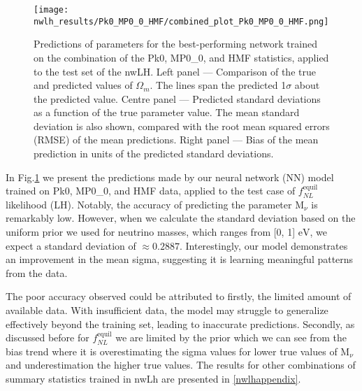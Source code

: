 \begin{figure}[htbp]
    \centering
    \texttt{[image: nwlh\_results/Pk0\_MP0\_0\_HMF/combined\_plot\_Pk0\_MP0\_0\_HMF.png]}
    \caption{Predictions of parameters for the best-performing network trained on the combination of the Pk0, MP0\_0, and HMF statistics, applied to the test set of the nwLH. Left panel — Comparison of the true and predicted values of $\Omega_m$. The lines span the predicted 1$\sigma$ about the predicted value. Centre panel — Predicted standard deviations as a function of the true parameter value. The mean standard deviation is also shown, compared with the root mean squared errors (RMSE) of the mean predictions. Right panel — Bias of the mean prediction in units of the predicted standard deviations.}
    \label{fig:Pk0_MP0_0_HMFnwlh}
\end{figure}

In Fig.\ref{fig:Pk0_MP0_0_HMFnwlh} we present the predictions made by our neural network (NN) model trained on Pk0, MP0\_0, and HMF data, applied to the test case of $f_{NL}^{\mathrm{equil}}$ likelihood (LH). Notably, the accuracy of predicting the parameter $\mathrm{M}_{\nu}$ is remarkably low. However, when we calculate the standard deviation based on the uniform prior we used for neutrino masses, which ranges from [0, 1] $\mathrm{eV}$, we expect a standard deviation of $\approx 0.2887$. Interestingly, our model demonstrates an improvement in the mean sigma, suggesting it is learning meaningful patterns from the data.

The poor accuracy observed could be attributed to firstly, the limited amount of available data. With insufficient data, the model may struggle to generalize effectively beyond the training set, leading to inaccurate predictions. Secondly, as discussed before for $f_{NL}^\mathrm{equil}$ we are limited by the prior which we can see from the bias trend where it is overestimating the sigma values for lower true values of $\mathrm{M}_{\nu}$ and underestimation the higher true values.
The results for other combinations of summary statistics trained in nwLh are presented in \ref{nwlhappendix}.
